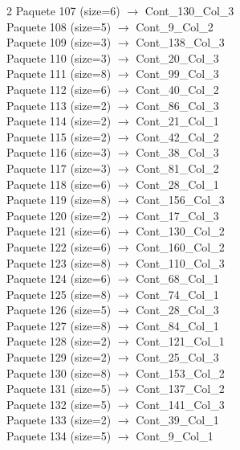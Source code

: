 \begin{multicols}{2}
Paquete 107 (size=6) $\rightarrow$ Cont\_130\_Col\_3\\
Paquete 108 (size=5) $\rightarrow$ Cont\_9\_Col\_2\\
Paquete 109 (size=3) $\rightarrow$ Cont\_138\_Col\_3\\
Paquete 110 (size=3) $\rightarrow$ Cont\_20\_Col\_3\\
Paquete 111 (size=8) $\rightarrow$ Cont\_99\_Col\_3\\
Paquete 112 (size=6) $\rightarrow$ Cont\_40\_Col\_2\\
Paquete 113 (size=2) $\rightarrow$ Cont\_86\_Col\_3\\
Paquete 114 (size=2) $\rightarrow$ Cont\_21\_Col\_1\\
Paquete 115 (size=2) $\rightarrow$ Cont\_42\_Col\_2\\
Paquete 116 (size=3) $\rightarrow$ Cont\_38\_Col\_3\\
Paquete 117 (size=3) $\rightarrow$ Cont\_81\_Col\_2\\
Paquete 118 (size=6) $\rightarrow$ Cont\_28\_Col\_1\\
Paquete 119 (size=8) $\rightarrow$ Cont\_156\_Col\_3\\
Paquete 120 (size=2) $\rightarrow$ Cont\_17\_Col\_3\\
Paquete 121 (size=6) $\rightarrow$ Cont\_130\_Col\_2\\
Paquete 122 (size=6) $\rightarrow$ Cont\_160\_Col\_2\\
Paquete 123 (size=8) $\rightarrow$ Cont\_110\_Col\_3\\
Paquete 124 (size=6) $\rightarrow$ Cont\_68\_Col\_1\\
Paquete 125 (size=8) $\rightarrow$ Cont\_74\_Col\_1\\
Paquete 126 (size=5) $\rightarrow$ Cont\_28\_Col\_3\\
Paquete 127 (size=8) $\rightarrow$ Cont\_84\_Col\_1\\
Paquete 128 (size=2) $\rightarrow$ Cont\_121\_Col\_1\\
Paquete 129 (size=2) $\rightarrow$ Cont\_25\_Col\_3\\
Paquete 130 (size=8) $\rightarrow$ Cont\_153\_Col\_2\\
Paquete 131 (size=5) $\rightarrow$ Cont\_137\_Col\_2\\
Paquete 132 (size=5) $\rightarrow$ Cont\_141\_Col\_3\\
Paquete 133 (size=2) $\rightarrow$ Cont\_39\_Col\_1\\
Paquete 134 (size=5) $\rightarrow$ Cont\_9\_Col\_1\\

\end{multicols}
